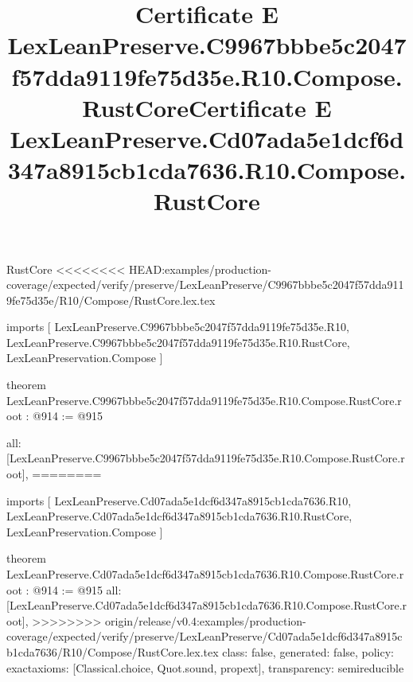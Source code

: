 \begin{lexlean}{RustCore}
<<<<<<<< HEAD:examples/production-coverage/expected/verify/preserve/LexLeanPreserve/C9967bbbe5c2047f57dda9119fe75d35e/R10/Compose/RustCore.lex.tex
\title{Certificate E LexLeanPreserve.C9967bbbe5c2047f57dda9119fe75d35e.R10.Compose.RustCore}
\begin{coremodule}
imports [
  LexLeanPreserve.C9967bbbe5c2047f57dda9119fe75d35e.R10,
  LexLeanPreserve.C9967bbbe5c2047f57dda9119fe75d35e.R10.RustCore,
  LexLeanPreservation.Compose
]

theorem LexLeanPreserve.C9967bbbe5c2047f57dda9119fe75d35e.R10.Compose.RustCore.root : @914 := @915 {
  all: [LexLeanPreserve.C9967bbbe5c2047f57dda9119fe75d35e.R10.Compose.RustCore.root],
========
\title{Certificate E LexLeanPreserve.Cd07ada5e1dcf6d347a8915cb1cda7636.R10.Compose.RustCore}
\begin{coremodule}
imports [
  LexLeanPreserve.Cd07ada5e1dcf6d347a8915cb1cda7636.R10,
  LexLeanPreserve.Cd07ada5e1dcf6d347a8915cb1cda7636.R10.RustCore,
  LexLeanPreservation.Compose
]

theorem LexLeanPreserve.Cd07ada5e1dcf6d347a8915cb1cda7636.R10.Compose.RustCore.root : @914 := @915 {
  all: [LexLeanPreserve.Cd07ada5e1dcf6d347a8915cb1cda7636.R10.Compose.RustCore.root],
>>>>>>>> origin/release/v0.4:examples/production-coverage/expected/verify/preserve/LexLeanPreserve/Cd07ada5e1dcf6d347a8915cb1cda7636/R10/Compose/RustCore.lex.tex
  class: false,
  generated: false,
  policy: exact{axioms: [Classical.choice, Quot.sound, propext]},
  transparency: semireducible
}


\end{coremodule}}
\end{coremodule}
\end{lexlean}
